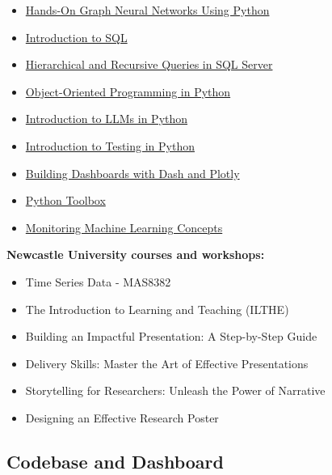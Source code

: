 \begin{itemize}
    \item \href{https://github.com/PacktPublishing/Hands-On-Graph-Neural-Networks-Using-Python}{Hands-On Graph Neural Networks Using Python}
    \item \href{https://app.datacamp.com/learn/courses/introduction-to-sql}{Introduction to SQL}
    \item \href{https://app.datacamp.com/learn/courses/hierarchical-and-recursive-queries-in-sql-server}{Hierarchical and Recursive Queries in SQL Server}
    \item \href{https://app.datacamp.com/learn/courses/object-oriented-programming-in-python}{Object-Oriented Programming in Python}
    \item \href{https://app.datacamp.com/learn/courses/introduction-to-llms-in-python}{Introduction to LLMs in Python}
    \item \href{https://app.datacamp.com/learn/courses/introduction-to-testing-in-python}{Introduction to Testing in Python}
    \item \href{https://app.datacamp.com/learn/courses/building-dashboards-with-dash-and-plotly}{Building Dashboards with Dash and Plotly}
    \item \href{https://app.datacamp.com/learn/courses/python-toolbox}{Python Toolbox}
    \item \href{https://app.datacamp.com/learn/courses/monitoring-machine-learning-concepts}{Monitoring Machine Learning Concepts}
\end{itemize}

\textbf{Newcastle University courses and workshops:}

\begin{itemize}
    \item Time Series Data - MAS8382
    \item The Introduction to Learning and Teaching (ILTHE)
    \item Building an Impactful Presentation: A Step-by-Step Guide
    \item Delivery Skills: Master the Art of Effective Presentations
    \item Storytelling for Researchers: Unleash the Power of Narrative
    \item Designing an Effective Research Poster
\end{itemize}

\subsection{Codebase and Dashboard}

